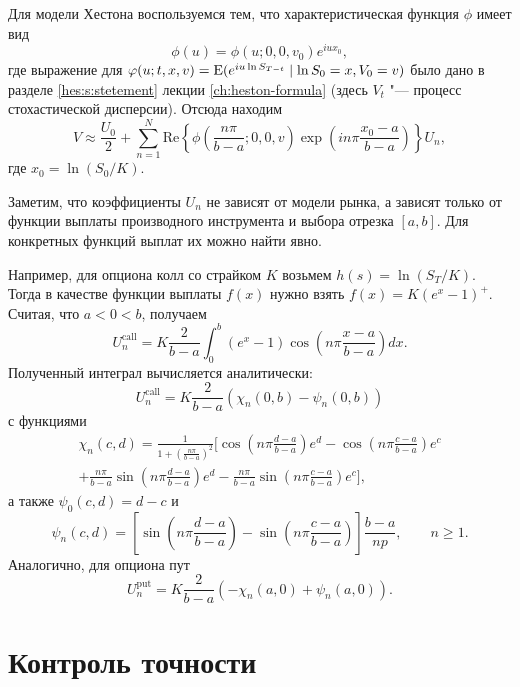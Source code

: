 Для модели Хестона воспользуемся тем, что характеристическая функция $\phi$ имеет вид
\[
\phi(u) = \phi(u; 0,0,v_0) e^{iux_0},
\]
где выражение для $\varphi(u;t,x,v) = \operatorname{E}(e^{iu\ln S_{T-t}} \mid \ln S_0=x, V_0=v)$ было дано в разделе \ref{hes:s:stetement} лекции \ref{ch:heston-formula} (здесь $V_t$ "--- процесс стохастической дисперсии).
Отсюда находим
\[
V \approx 
  \frac{U_0}{2} 
    + \sum_{n=1}^N \mathrm{Re}\left\{
      \phi\left(\frac{n\pi}{b-a};0,0,v\right) \exp\left(in\pi \frac{x_0-a}{b-a}\right) 
    \right\} U_n,
\]
где $x_0 = \ln(S_0/K)$.

Заметим, что коэффициенты $U_n$ не зависят от модели рынка, а зависят только от функции выплаты производного инструмента и выбора отрезка $[a,b]$.
Для конкретных функций выплат их можно найти явно.

Например, для опциона колл со страйком $K$ возьмем $h(s) = \ln(S_T/K)$.
Тогда в качестве функции выплаты $f(x)$ нужно взять $f(x) = K(e^x-1)^+$.
Считая, что $a<0<b$, получаем
\[
U_n^\text{call} = K\frac{2}{b-a}\int_0^b (e^x-1) \cos\left(n\pi\frac{x-a}{b-a}\right) dx.
\]
Полученный интеграл вычисляется аналитически:
\[
U_n^\text{call} = K\frac{2}{b-a}(\chi_n(0,b) - \psi_n(0,b))
\]
с функциями
\begin{multline*}
\chi_n(c,d) = \frac{1}{1+\left(\frac{n\pi}{b-a}\right)^2}\biggl[\cos\left(n\pi \frac{d-a}{b-a}\right)e^d - \cos\left(n\pi\frac{c-a}{b-a}\right)e^c \\
+\frac{n\pi}{b-a}\sin\left(n\pi\frac{d-a}{b-a}\right)e^d - \frac{n\pi}{b-a}\sin\left(n\pi\frac{c-a}{b-a}\right)e^c\biggr],
\end{multline*}
а также $\psi_0(c,d) = d-c$ и
\[
\psi_n(c,d) = \left[\sin\left(n\pi\frac{d-a}{b-a}\right) - \sin\left(n\pi\frac{c-a}{b-a}\right)\right]\frac{b-a}{np}, \qquad n\ge 1.
\]
Аналогично, для опциона пут
\[
U_n^\text{put} = K\frac{2}{b-a}(-\chi_n(a,0) + \psi_n(a,0)).
\]


\section{Контроль точности}

